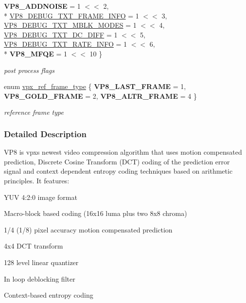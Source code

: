 \begin{DoxyCompactItemize}
{\bfseries V\+P8\+\_\+\+A\+D\+D\+N\+O\+I\+SE} = 1 $<$$<$ 2, 
\\*
\hyperlink{group__vp8_gga99557e20eb37826e6792cd8819121770ab52568f51e409f219744e06b446102bb}{V\+P8\+\_\+\+D\+E\+B\+U\+G\+\_\+\+T\+X\+T\+\_\+\+F\+R\+A\+M\+E\+\_\+\+I\+N\+FO} = 1 $<$$<$ 3, 
\hyperlink{group__vp8_gga99557e20eb37826e6792cd8819121770a9e3fd9032d2556918d0f6d0d1ef46d14}{V\+P8\+\_\+\+D\+E\+B\+U\+G\+\_\+\+T\+X\+T\+\_\+\+M\+B\+L\+K\+\_\+\+M\+O\+D\+ES} = 1 $<$$<$ 4, 
\hyperlink{group__vp8_gga99557e20eb37826e6792cd8819121770acc0405eaa19b1ed01fb40945cfce4d12}{V\+P8\+\_\+\+D\+E\+B\+U\+G\+\_\+\+T\+X\+T\+\_\+\+D\+C\+\_\+\+D\+I\+FF} = 1 $<$$<$ 5, 
\hyperlink{group__vp8_gga99557e20eb37826e6792cd8819121770aff0413e7978a7cf8915b8341373751b5}{V\+P8\+\_\+\+D\+E\+B\+U\+G\+\_\+\+T\+X\+T\+\_\+\+R\+A\+T\+E\+\_\+\+I\+N\+FO} = 1 $<$$<$ 6, 
\\*
{\bfseries V\+P8\+\_\+\+M\+F\+QE} = 1 $<$$<$ 10
 \}\begin{DoxyCompactList}\small\item\em post process flags \end{DoxyCompactList}
\item 
enum \hyperlink{group__vp8_gad8ab72d8a178a68339dad2987358c331}{vpx\+\_\+ref\+\_\+frame\+\_\+type} \{ {\bfseries V\+P8\+\_\+\+L\+A\+S\+T\+\_\+\+F\+R\+A\+ME} = 1, 
{\bfseries V\+P8\+\_\+\+G\+O\+L\+D\+\_\+\+F\+R\+A\+ME} = 2, 
{\bfseries V\+P8\+\_\+\+A\+L\+T\+R\+\_\+\+F\+R\+A\+ME} = 4
 \}\begin{DoxyCompactList}\small\item\em reference frame type \end{DoxyCompactList}
\end{DoxyCompactItemize}


\subsubsection{Detailed Description}
V\+P8 is vpx\textquotesingle{}s newest video compression algorithm that uses motion compensated prediction, Discrete Cosine Transform (D\+CT) coding of the prediction error signal and context dependent entropy coding techniques based on arithmetic principles. It features\+:
\begin{DoxyItemize}
\item Y\+UV 4\+:2\+:0 image format
\item Macro-\/block based coding (16x16 luma plus two 8x8 chroma)
\item 1/4 (1/8) pixel accuracy motion compensated prediction
\item 4x4 D\+CT transform
\item 128 level linear quantizer
\item In loop deblocking filter
\item Context-\/based entropy coding 
\end{DoxyItemize}

